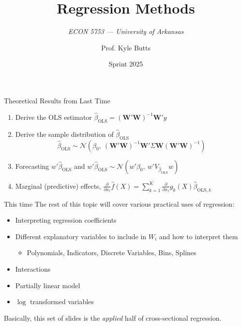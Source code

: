 \documentclass[aspectratio=169,t,11pt,table]{beamer}
\title{Regression Methods}
\subtitle{\it  ECON 5753 — University of Arkansas}
\date{Sprint 2025}
\author{Prof. Kyle Butts}
\begin{document}
\begin{frame}
\maketitle
\end{frame}

\begin{frame}{Theoretical Results from Last Time}
  \begin{enumerate}
    \item Derive the OLS estimator $\hat{\beta}_{\text{OLS}} = (\bm{W}' \bm{W})^{-1} \bm{W}' y$
    
    \bigskip
    \item Derive the sample distribution of $\hat{\beta}_{\text{OLS}}$
    $$
      \hat{\beta}_{\text{OLS}} \sim \mathcal{N}(\beta_0, \ (\bm{W}' \bm{W})^{-1} \bm{W}' \Sigma \bm{W} (\bm{W}' \bm{W})^{-1})
    $$
    
    \bigskip
    \item Forecasting $w' \hat{\beta}_{\text{OLS}}$ and $w' \hat{\beta}_{\text{OLS}} \sim \mathcal{N}(w' \beta_0, \ w' V_{\hat{\beta}_{\text{OLS}}} w)$
    
    \bigskip
    \item Marginal (predictive) effects, $\frac{\partial}{\partial x_\ell} \hat{f}(X) = \sum_{k=1}^K \frac{\partial}{\partial x_\ell} g_{k}(X) \hat{\beta}_{\text{OLS}, k}$
  \end{enumerate}
\end{frame}

\begin{frame}{This time}
  The rest of this topic will cover various practical uses of regression:
  \begin{itemize}
    \item Interpreting regression coefficients

    \item Different explanatory variables to include in $W_i$ and how to interpret them
    
    \begin{itemize}
      \item Polynomials, Indicators, Discrete Variables, Bins, Splines
    \end{itemize}

    \item Interactions

    \item Partially linear model
    
    \item $\log$ transformed variables
  \end{itemize}

  
  \bigskip
  Basically, this set of slides is the \emph{applied} half of cross-sectional regression.
\end{frame}
\end{document}
